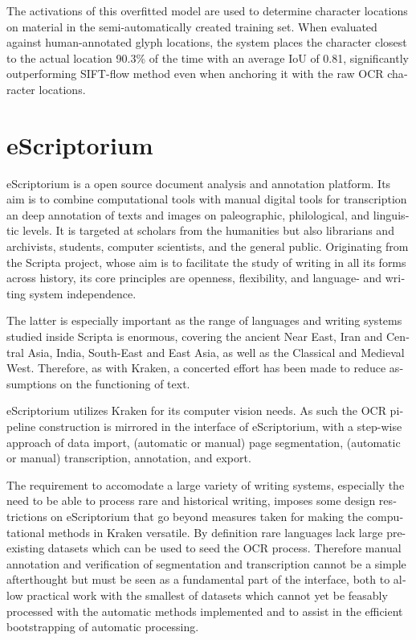 \begin{french}
The activations of this overfitted model are used to determine character
locations on material in the semi-automatically created training set. When
evaluated against human-annotated glyph locations, the system places the
character closest to the actual location 90.3\% of the time with an average IoU
of 0.81, significantly outperforming SIFT-flow method even when anchoring it
with the raw OCR character locations.

\section{eScriptorium}

eScriptorium is a open source document analysis and annotation platform. Its
aim is to combine computational tools with manual digital tools for
transcription an deep annotation of texts and images on paleographic,
philological, and linguistic levels. It is targeted at scholars from the
humanities but also librarians and archivists, students, computer scientists,
and the general public. Originating from the Scripta project, whose aim is to
facilitate the study of writing in all its forms across history, its core
principles are openness, flexibility, and language- and writing system
independence. 

The latter is especially important as the range of languages and writing
systems studied inside Scripta is enormous, covering the ancient Near East,
Iran and Central Asia, India, South-East and East Asia, as well as the
Classical and Medieval West. Therefore, as with Kraken, a concerted effort has
been made to reduce assumptions on the functioning of text.

eScriptorium utilizes Kraken for its computer vision needs. As such the OCR
pipeline construction is mirrored in the interface of eScriptorium, with a
step-wise approach of data import, (automatic or manual) page segmentation,
(automatic or manual) transcription, annotation, and export.

The requirement to accomodate a large variety of writing systems, especially
the need to be able to process rare and historical writing,  imposes some
design restrictions on eScriptorium that go beyond measures taken for making
the computational methods in Kraken versatile. By definition rare languages
lack large pre-existing datasets which can be used to seed the OCR process.
Therefore manual annotation and verification of segmentation and transcription
cannot be a simple afterthought but must be seen as a fundamental part of the
interface, both to allow practical work with the smallest of datasets which
cannot yet be feasably processed with the automatic methods implemented and to
assist in the efficient bootstrapping of automatic processing.


\end{french}
